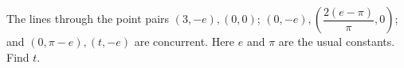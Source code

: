 The lines through the point pairs $(3,-e),(0,0)$; $(0,-e),(\dfrac{2(e-\pi)}{\pi},0)$; and $(0,\pi-e),(t,-e)$ are concurrent. Here $e$ and $\pi$ are the usual constants. Find $t$.
